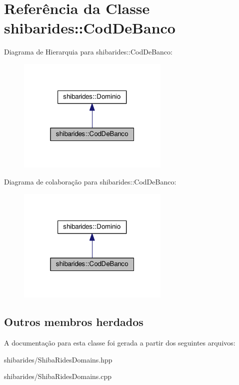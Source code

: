 \hypertarget{classshibarides_1_1CodDeBanco}{}\section{Referência da Classe shibarides\+:\+:Cod\+De\+Banco}
\label{classshibarides_1_1CodDeBanco}


Diagrama de Hierarquia para shibarides\+:\+:Cod\+De\+Banco\+:\nopagebreak
\begin{figure}[H]
\begin{center}
\leavevmode
\includegraphics[width=205pt]{classshibarides_1_1CodDeBanco__inherit__graph}
\end{center}
\end{figure}


Diagrama de colaboração para shibarides\+:\+:Cod\+De\+Banco\+:\nopagebreak
\begin{figure}[H]
\begin{center}
\leavevmode
\includegraphics[width=205pt]{classshibarides_1_1CodDeBanco__coll__graph}
\end{center}
\end{figure}
\subsection*{Outros membros herdados}


A documentação para esta classe foi gerada a partir dos seguintes arquivos\+:\begin{DoxyCompactItemize}
\item 
shibarides/Shiba\+Rides\+Domains.\+hpp\item 
shibarides/Shiba\+Rides\+Domains.\+cpp\end{DoxyCompactItemize}
